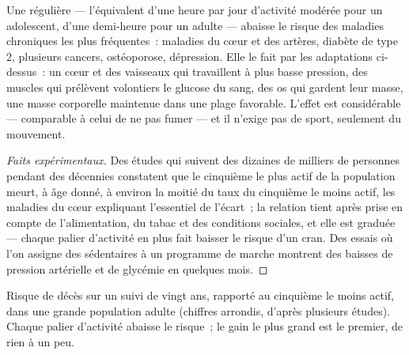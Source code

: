 \begin{proposition}\label{prop:g10:sport-and-health:health}
Une  régulière --- l'équivalent d'une heure par jour
d'activité modérée pour un adolescent, d'une demi-heure pour un adulte
--- abaisse le risque des maladies chroniques les plus fréquentes~:
maladies du cœur et des artères, diabète de type 2, plusieurs cancers,
ostéoporose, dépression. Elle le fait par les adaptations ci-dessus~:
un cœur et des vaisseaux qui travaillent à plus basse pression, des
muscles qui prélèvent volontiers le glucose du sang, des os qui gardent
leur masse, une masse corporelle maintenue dans une plage favorable.
L'effet est considérable --- comparable à celui de ne pas fumer --- et
il n'exige pas de sport, seulement du mouvement.
\end{proposition}
\begin{proof}[Faits expérimentaux]
Des études qui suivent des dizaines de milliers de personnes pendant
des décennies constatent que le cinquième le plus actif de la
population meurt, à âge donné, à environ la moitié du taux du cinquième
le moins actif, les maladies du cœur expliquant l'essentiel de l'écart~;
la relation tient après prise en compte de l'alimentation, du tabac et
des conditions sociales, et elle est graduée --- chaque palier
d'activité en plus fait baisser le risque d'un cran. Des essais où l'on
assigne des sédentaires à un programme de marche montrent des baisses
de pression artérielle et de glycémie en quelques mois.
\end{proof}

\begin{omfigure}

{\small Risque de décès sur un suivi de vingt ans, rapporté au
cinquième le moins actif, dans une grande population adulte (chiffres
arrondis, d'après plusieurs études). Chaque palier d'activité abaisse
le risque~; le gain le plus grand est le premier, de rien à un peu.}
\end{omfigure}

